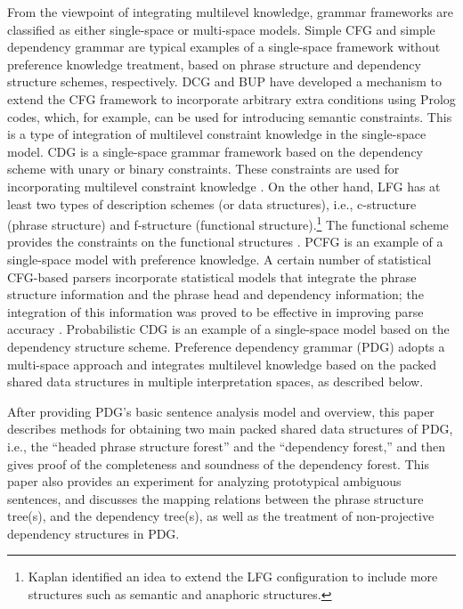 \documentclass[english]{jnlp_1.4_rep}
\theoremstyle{break}
\theoremstyle{plain}
\theoremstyle{plain}
\begin{document}
From the viewpoint of integrating multilevel knowledge, grammar
frameworks are classified as either single-space or multi-space
models. Simple CFG and simple dependency grammar are typical examples
of a single-space framework without preference knowledge treatment,
based on phrase structure and dependency structure schemes,
respectively. DCG \cite{Pereira80} and BUP \cite{Matsumoto83} have
developed a mechanism to extend the CFG framework to incorporate
arbitrary extra conditions using Prolog codes, which, for example, can
be used for introducing semantic constraints. This is a type of
integration of multilevel constraint knowledge in the single-space
model. CDG is a single-space grammar framework based on the dependency
scheme with unary or binary constraints. These constraints are used
for incorporating multilevel constraint knowledge \cite{Maruyama90}.
On the other hand, LFG has at least two types of description schemes
(or data structures), i.e., c-structure (phrase structure) and
f-structure (functional structure).\footnote{Kaplan identified an idea
  to extend the LFG configuration to include more structures such as
  semantic and anaphoric structures.} The functional scheme provides
the constraints on the functional structures \cite{Kaplan89}.  PCFG
\cite{jelinek92} is an example of a single-space model with preference
knowledge. A certain number of statistical CFG-based parsers
incorporate statistical models that integrate the phrase structure
information and the phrase head and dependency information; the
integration of this information was proved to be effective in
improving parse accuracy
\cite{Carroll92,Eisner96b,Collins99,Charniak00,Bikel04}. Probabilistic
CDG \cite{Wang04} is an example of a single-space model based on the
dependency structure scheme. Preference dependency grammar (PDG)
adopts a multi-space approach and integrates multilevel knowledge
based on the packed shared data structures in multiple interpretation
spaces, as described below.

After providing PDG's basic sentence analysis model and overview,
this paper describes methods for obtaining two main packed shared data
structures of PDG, i.e., the ``headed phrase structure forest'' and
the ``dependency forest,'' and then gives proof of the completeness and
soundness of the dependency forest. This paper also provides an
experiment for analyzing prototypical ambiguous sentences, and
discusses the mapping relations between the phrase structure tree(s),
and the dependency tree(s), as well as the treatment of non-projective
dependency structures in PDG.
\end{document}

